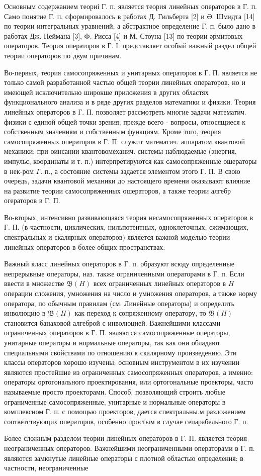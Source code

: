 \documentclass[10pt]{article}
\begin{document}
Основным содержанием теориі Г. п. является теория линейных операторов в Г. п. Само понятие Г. п. сформировалось в работах Д. Гильберта [2] и Ә. Шмидта [14] по теории интегральных уравнений, а абстрактное определение Г. п. было дано в работах Дж. Неймана [3], Ф. Рисса [4] и М. Стоуна [13] по теории әрмитовых операторов. Теория операторов в Г. І. представляет особый важный раздел общей теории операторов по двум причинам.



Во-первых, теория самосопряженных и унитарных операторов в Г. П. является не только самой разработанной частью общей теории линейных операторов, но и имеющей исключительно широкше приложения в других областях функционального анализа и в ряде других разделов математики и физики. Теория линейных операторов в Г. П. позволяет рассмотреть многие задачи математич. физики с единой общей точки зрения; прежде всего - вопросы, относящиеся к собственным значениям и собственным функциям. Кроме того, теория самосопряженных операторов в Г. П. служит математич. аппаратом квантовой механики: при оинсании квантовомеханич. системы наблюдаемые (энергия, импульс, координаты и т. п.) интерпретируются как самосопряженные ошераторы в нек-ром $\Gamma$. п., а состояние системы задается элементом этого Г. П. В свою очередь, задачи квантовой механики до настоящего времени оказывают влияние на развитие теории самосопряженных ошераторов, а также теории алгебр огераторов в Г. П.



Во-вторых, интенсивно развивающаяся теория несамосопряженных операторов в Г. П. (в частности, циклических, нильпотентных, одноклеточных, сжимающих, спектральных и скалярных операторов) является важной моделью теории линейных операторов в более общих пространствах.



Важный класс линейных операторов в Г. п. образуют всюду определенные непрерывные операторы, наз. также ограниченными операторами в Г. п. Если ввести в множестве $\mathfrak{B}(H)$ всех ограниченных линейных операторов в $H$ операции сложения, умножения на число и умножения операторов, а также норму оператора, по обычным правилам (см. Линейные операторы) и определить инволюцию в $\mathfrak{B}(H)$ как переход к сопряженному оператору, то $\mathfrak{B}(H)$ становится банаховой алгеброй с инволюцией. Важнейшими классами ограниченных операторов в Г. П. являются самосопряженные операторы, унитарные операторы и нормальные операторы, так как они обладают специальными свойствами по отношению к скалярному произведению. Эти классы операторов хөрошо изучены; основным инструментом в их изучении являются простейшие из ограниченных самосопряженных операторов, а именно: операторы ортогонального проектирования, или ортогональные проекторы, часто называемые просто проекторами. Способ, позволяющий строить любые ограниченные самосопряженные, унитарные и нормальные операторы в комплексном Г. п. с помощью проекторов, дается спектральны.м разложением соответствующих операторов, особенно простым в случае сепарабельного Г. п.



Более сложным разделом теории линейных операторов в Г. П. является теория неограниченных операторов. Важнейшими неограниченными операторами в Г. п. являются замкнутые линейные операторы с плотной областью определения; в частности, неограниченные
\end{document}
